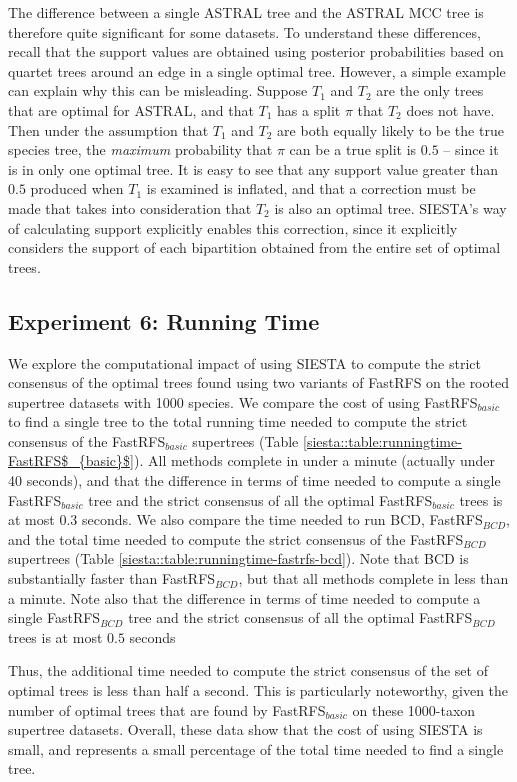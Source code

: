 The difference between a single ASTRAL tree and the ASTRAL MCC tree  is therefore quite significant for some datasets. To understand these differences, recall that  the support values are obtained using posterior probabilities based on quartet trees around an edge in a single optimal tree. 
However, a simple example can explain why this can be misleading. Suppose $T_1$ and $T_2$ are the only trees that are optimal for ASTRAL, and that $T_1$ has a split $\pi$ that $T_2$ does not have.
Then under the assumption that $T_1$ and $T_2$ are both equally likely to be the true species tree, the {\em maximum} probability that $\pi$ can be a true split is $0.5$ -- since it is in only one optimal tree.  
It is easy to see that any support value greater than $0.5$ produced when $T_1$ is examined is inflated, and that a correction must be made that takes into consideration that $T_2$ is also an optimal tree.
SIESTA's way of calculating support explicitly enables this correction, since it explicitly considers the support of each bipartition obtained from the entire set of optimal trees. 


\subsection{Experiment 6: Running Time}
We explore the  computational impact of using SIESTA  to compute the strict consensus of the optimal trees found using two variants of FastRFS  on the rooted supertree datasets with 1000 species.
We compare the cost of using FastRFS$_{basic}$ to find a single tree to the total running time needed
to compute the strict consensus of the FastRFS$_{basic}$ supertrees (Table \ref{siesta::table:runningtime-FastRFS$_{basic}$}).
All methods complete in under a minute (actually under 40 seconds), and that the difference in terms of time needed to compute a single FastRFS$_{basic}$ tree and the strict consensus of all the optimal FastRFS$_{basic}$ trees
is at most $0.3$ seconds.
We  also compare the time needed to run BCD, FastRFS$_{BCD}$, and the total time needed to compute the
strict consensus of the FastRFS$_{BCD}$ supertrees (Table \ref{siesta::table:runningtime-fastrfs-bcd}).
Note that BCD is substantially faster than FastRFS$_{BCD}$, but that all methods complete in less than a minute.
Note also that the difference in terms of time needed to compute a single FastRFS$_{BCD}$ tree and the strict consensus of all the optimal FastRFS$_{BCD}$ trees
is at most $0.5$ seconds 

Thus, the additional time needed to compute the strict consensus of the set of optimal trees is less than half a second. This is particularly noteworthy, given the number of optimal trees that are found by FastRFS$_{basic}$ on these 1000-taxon supertree datasets. Overall, these data show that the cost of using SIESTA is small, and represents a small percentage of the total time needed to find a single tree.


